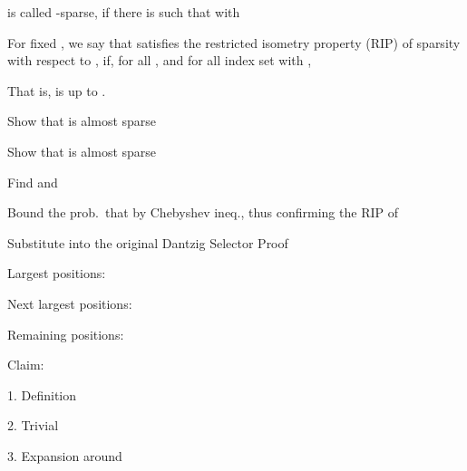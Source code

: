 {
\I {} is called -sparse, if there is  such that
with
}
{
\I For fixed , we say that \m {\M{\Phi}} satisfies the restricted isometry property (RIP) of sparsity  with respect to , if, for all , and for all index set  with ,

\I That is, \m {\M{\Phi}} is  up to  .
}
{
\I Show that  is almost sparse

\I Show that  is almost sparse

\I Find  and 

\I Bound the prob.\ that  by Chebyshev ineq., thus confirming the RIP of 

\I Substitute  into the original Dantzig Selector Proof
}
{
\I Largest  positions: 

\I Next largest  positions: 

\I Remaining positions: 

\I Claim:
}
{

1. Definition

2. Trivial

3. Expansion around 
}
